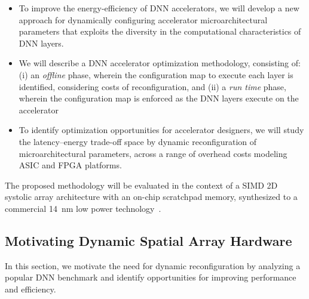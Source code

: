 \begin{itemize}
    \item To improve the energy-efficiency of DNN accelerators, we will develop a new approach for dynamically configuring accelerator microarchitectural parameters that exploits the diversity in the computational characteristics of DNN layers.
    \item We will describe a DNN accelerator optimization methodology, consisting of: (i) an \emph{offline} phase, wherein the configuration map to execute each layer is identified, considering costs of reconfiguration, and (ii) a \emph{run time} phase, wherein the configuration map is enforced as the DNN layers execute on the accelerator 
    \item To identify optimization opportunities for accelerator designers, we will study the latency--energy trade-off space by dynamic reconfiguration of microarchitectural parameters, across a range of overhead costs modeling ASIC and FPGA platforms. 
\end{itemize}

The proposed methodology will be evaluated in the context of a SIMD 2D systolic array architecture with an on-chip scratchpad memory, synthesized to a commercial 14~nm low power technology~\cite{venkataramani2017scaledeep}.

\subsection{Motivating Dynamic Spatial Array Hardware}

In this section, we motivate the need for dynamic reconfiguration by analyzing a popular DNN benchmark and identify opportunities for improving performance and efficiency.

